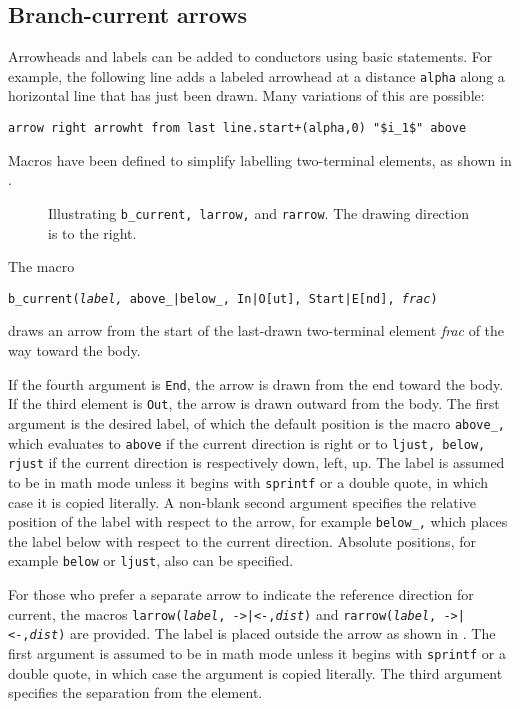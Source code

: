 \subsection{Branch-current arrows\label{Branchcurrent:}}
Arrowheads and labels can be added to conductors using basic
\pic statements.  For example, the following line adds a labeled
arrowhead at a distance {\tt alpha} along a horizontal line that has
just been drawn.  Many variations of this are possible:

  \verb|arrow right arrowht from last line.start+(alpha,0) "$i_1$" above|

\enlargethispage{\baselineskip}%
Macros have been defined to simplify labelling two-terminal
elements, as shown in .
\begin{figure}[H]
   
   \caption{Illustrating {\tt b\_current, larrow,} and {\tt rarrow}.
      The drawing direction is to the right.}
   \label{currents}
   \end{figure}
The macro

   {\tt b\_current({\sl label,} above\_|below\_, In|O[ut], Start|E[nd],
   {\sl frac})}

\noindent
draws an arrow from the start of the last-drawn two-terminal element
{\sl frac} of the way toward the body.

If the fourth argument is {\tt End}, the arrow is drawn from the end
toward the body.
If the third element is {\tt Out}, the arrow is drawn outward from the body.
The first argument is the desired label, of which the default position is
the macro {\tt above\_,} which evaluates to {\tt above} if the current
direction is right or to {\tt ljust, below, rjust} if the current
direction is respectively down, left, up.  The label is assumed to be
in math mode unless it begins with {\tt sprintf} or a double quote, in which
case it is copied literally.  A non-blank second argument specifies the
relative position of the label with respect to the arrow, for example
{\tt below\_,} which places the label below with respect to the current
direction.  Absolute positions, for example {\tt below} or {\tt ljust},
also can be specified.

For those who prefer a separate arrow to indicate the reference
direction for current, the macros {\tt larrow({\sl label}, ->|<-,{\sl dist})}
and {\tt rarrow({\sl label}, ->|<-,{\sl dist})} are provided.  The label is
placed outside the arrow as shown in .
The first argument is assumed to be in math mode unless
it begins with {\tt sprintf} or a double
quote, in which case the argument is copied literally.
The third argument specifies the separation from the element.


